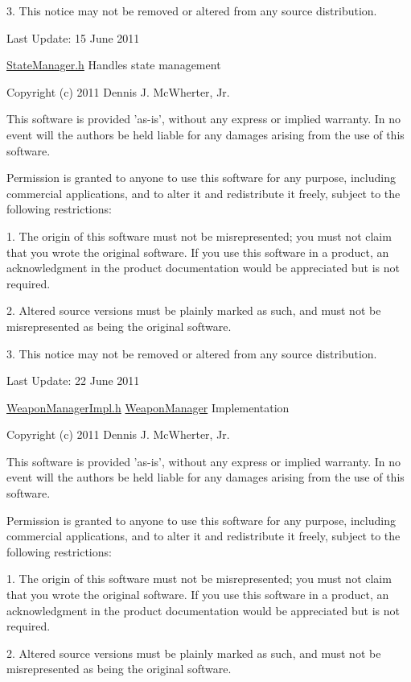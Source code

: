 3. This notice may not be removed or altered from any source distribution.

Last Update: 15 June 2011

\hyperlink{_state_manager_8h_source}{StateManager.h} Handles state management

Copyright (c) 2011 Dennis J. McWherter, Jr.

This software is provided 'as-\/is', without any express or implied warranty. In no event will the authors be held liable for any damages arising from the use of this software.

Permission is granted to anyone to use this software for any purpose, including commercial applications, and to alter it and redistribute it freely, subject to the following restrictions:

1. The origin of this software must not be misrepresented; you must not claim that you wrote the original software. If you use this software in a product, an acknowledgment in the product documentation would be appreciated but is not required.

2. Altered source versions must be plainly marked as such, and must not be misrepresented as being the original software.

3. This notice may not be removed or altered from any source distribution.

Last Update: 22 June 2011

\hyperlink{_weapon_manager_impl_8h_source}{WeaponManagerImpl.h} \hyperlink{class_micro_f_p_s_1_1_weapon_manager}{WeaponManager} Implementation

Copyright (c) 2011 Dennis J. McWherter, Jr.

This software is provided 'as-\/is', without any express or implied warranty. In no event will the authors be held liable for any damages arising from the use of this software.

Permission is granted to anyone to use this software for any purpose, including commercial applications, and to alter it and redistribute it freely, subject to the following restrictions:

1. The origin of this software must not be misrepresented; you must not claim that you wrote the original software. If you use this software in a product, an acknowledgment in the product documentation would be appreciated but is not required.

2. Altered source versions must be plainly marked as such, and must not be misrepresented as being the original software.

